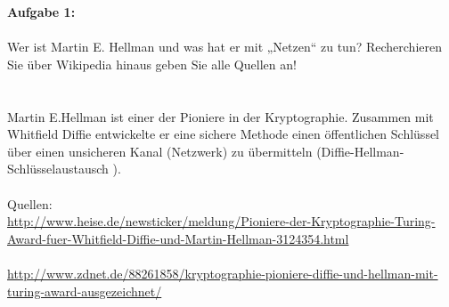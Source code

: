 \documentclass[12pt,a4paper]{report}
\theoremstyle{definition}
\begin{document}
\textbf{Aufgabe 1:}
\\
\\
Wer ist Martin E. Hellman und was hat er mit „Netzen“ zu tun? Recherchieren Sie über
Wikipedia hinaus geben Sie alle Quellen an!
\\
\\
\\
Martin E.Hellman ist einer der Pioniere in der Kryptographie. Zusammen mit Whitfield Diffie entwickelte er eine sichere Methode einen öffentlichen Schlüssel über einen unsicheren Kanal (Netzwerk) zu übermitteln (Diffie-Hellman-Schlüsselaustausch ).
\\
\\
Quellen:\\
\url{http://www.heise.de/newsticker/meldung/Pioniere-der-Kryptographie-Turing-Award-fuer-Whitfield-Diffie-und-Martin-Hellman-3124354.html}\\
\\
\url{http://www.zdnet.de/88261858/kryptographie-pioniere-diffie-und-hellman-mit-turing-award-ausgezeichnet/}
\end{document}
